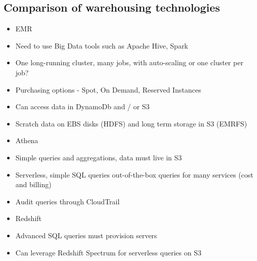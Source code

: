 \subsection{Comparison of warehousing technologies}
\begin{itemize}
    \item EMR
    \item Need to use Big Data tools such as Apache Hive, Spark
    \item One long-running cluster, many jobs, with auto-scaling or one cluster per job?
    \item Purchasing options - Spot, On Demand, Reserved Instances
    \item Can access data in DynamoDb and / or S3
    \item Scratch data on EBS disks (HDFS) and long term storage in S3 (EMRFS)
    \item Athena
    \item Simple queries and aggregations, data must live in S3
    \item Serverless, simple SQL queries out-of-the-box queries for many services (cost and billing)
    \item Audit queries through CloudTrail
    \item Redshift
    \item Advanced SQL queries must provision servers
    \item Can leverage Redshift Spectrum for serverless queries on S3
\end{itemize}